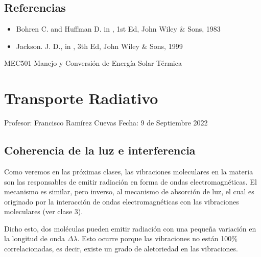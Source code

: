 \documentclass[letterpaper,10pt,english]{jupyterBook}
\begin{document}
\section{Referencias}
\label{\detokenize{4_Scattering/4_Scattering:referencias}}\begin{itemize}
\item {} 
\sphinxAtStartPar
Bohren C. and Huffman D.  in , 1st Ed, John Wiley \& Sons, 1983

\item {} 
\sphinxAtStartPar
Jackson. J. D.,  in , 3th Ed, John Wiley \& Sons, 1999

\end{itemize}

\sphinxstepscope

\sphinxAtStartPar
MEC501 \sphinxhyphen{} Manejo y Conversión de Energía Solar Térmica


\chapter{Transporte Radiativo}
\label{\detokenize{5_TransporteRadiativo/5_TransporteRadiativo:transporte-radiativo}}\label{\detokenize{5_TransporteRadiativo/5_TransporteRadiativo::doc}}
\sphinxAtStartPar

Profesor: Francisco Ramírez Cuevas
Fecha: 9 de Septiembre 2022


\section{Coherencia de la luz e interferencia}
\label{\detokenize{5_TransporteRadiativo/5_TransporteRadiativo:coherencia-de-la-luz-e-interferencia}}
\sphinxAtStartPar
Como veremos en las próximas clases, las vibraciones moleculares en la materia son las responsables de emitir radiación en forma de ondas electromagnéticas. El mecanismo es similar, pero inverso, al mecanismo de absorción de luz, el cual es originado por la interacción de ondas electromagnéticas con las vibraciones moleculares (ver clase 3).

\sphinxAtStartPar
Dicho esto, dos moléculas pueden emitir radiación con una pequeña variación en la longitud de onda \(\Delta\lambda\). Esto ocurre porque las vibraciones no están 100\% correlacionadas, es decir, existe un grado de aletoriedad en las vibraciones.
\end{document}
